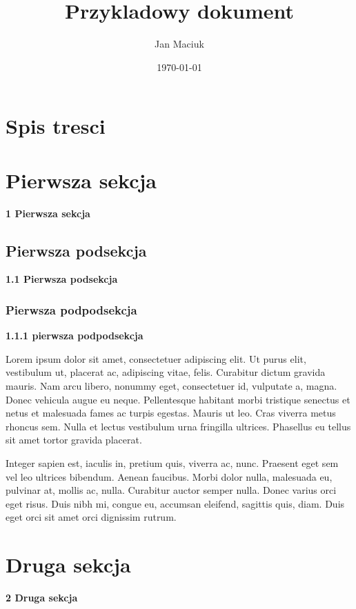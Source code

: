 \documentclass{article}
\title{Przykladowy dokument}
\author{Jan Maciuk}
\date{\today}
\begin{document}
\maketitle
\section{Spis tresci}

\section{Pierwsza sekcja}
\textbf{1 Pierwsza sekcja}

\subsection{Pierwsza podsekcja}
\textbf{1.1 Pierwsza podsekcja}

\subsubsection{Pierwsza podpodsekcja}
\textbf{1.1.1 pierwsza podpodsekcja}

Lorem ipsum dolor sit amet, consectetuer adipiscing elit. Ut purus elit, vestibulum ut, placerat ac, adipiscing vitae, felis. Curabitur dictum gravida mauris.
Nam arcu libero, nonummy eget, consectetuer id, vulputate a, magna. Donec vehicula augue eu neque. Pellentesque habitant morbi tristique senectus et netus et malesuada fames ac turpis egestas. 
Mauris ut leo. Cras viverra metus rhoncus sem. Nulla et lectus vestibulum urna fringilla ultrices. Phasellus eu tellus sit amet tortor gravida placerat. 

Integer sapien est, iaculis in, pretium quis, viverra ac, nunc. Praesent eget sem vel leo ultrices bibendum. Aenean faucibus.
Morbi dolor nulla, malesuada eu, pulvinar at, mollis ac, nulla. Curabitur auctor semper nulla. Donec varius orci eget risus. 
Duis nibh mi, congue eu, accumsan eleifend, sagittis quis, diam. Duis eget orci sit amet orci dignissim rutrum.

\newpage

\section{Druga sekcja}
\textbf{2 Druga sekcja}
\end{document}
